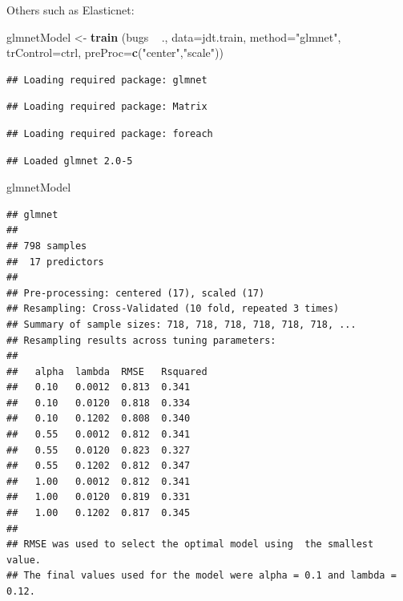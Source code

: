 \documentclass[]{book}
\newenvironment{Shaded}{\begin{snugshade}}{\end{snugshade}}
\newcommand{\KeywordTok}[1]{\textcolor[rgb]{0.13,0.29,0.53}{\textbf{{#1}}}}
\newcommand{\DataTypeTok}[1]{\textcolor[rgb]{0.13,0.29,0.53}{{#1}}}
\newcommand{\StringTok}[1]{\textcolor[rgb]{0.31,0.60,0.02}{{#1}}}
\newcommand{\NormalTok}[1]{{#1}}
\begin{document}
Others such as Elasticnet:

\begin{Shaded}
\begin{Highlighting}[]
\NormalTok{glmnetModel <-}\StringTok{ }\KeywordTok{train} \NormalTok{(bugs ~}\StringTok{ }\NormalTok{., }\DataTypeTok{data=}\NormalTok{jdt.train, }\DataTypeTok{method=}\StringTok{"glmnet"}\NormalTok{, }\DataTypeTok{trControl=}\NormalTok{ctrl, }\DataTypeTok{preProc=}\KeywordTok{c}\NormalTok{(}\StringTok{"center"}\NormalTok{,}\StringTok{"scale"}\NormalTok{))}
\end{Highlighting}
\end{Shaded}

\begin{verbatim}
## Loading required package: glmnet
\end{verbatim}

\begin{verbatim}
## Loading required package: Matrix
\end{verbatim}

\begin{verbatim}
## Loading required package: foreach
\end{verbatim}

\begin{verbatim}
## Loaded glmnet 2.0-5
\end{verbatim}

\begin{Shaded}
\begin{Highlighting}[]
\NormalTok{glmnetModel}
\end{Highlighting}
\end{Shaded}

\begin{verbatim}
## glmnet 
## 
## 798 samples
##  17 predictors
## 
## Pre-processing: centered (17), scaled (17) 
## Resampling: Cross-Validated (10 fold, repeated 3 times) 
## Summary of sample sizes: 718, 718, 718, 718, 718, 718, ... 
## Resampling results across tuning parameters:
## 
##   alpha  lambda  RMSE   Rsquared
##   0.10   0.0012  0.813  0.341   
##   0.10   0.0120  0.818  0.334   
##   0.10   0.1202  0.808  0.340   
##   0.55   0.0012  0.812  0.341   
##   0.55   0.0120  0.823  0.327   
##   0.55   0.1202  0.812  0.347   
##   1.00   0.0012  0.812  0.341   
##   1.00   0.0120  0.819  0.331   
##   1.00   0.1202  0.817  0.345   
## 
## RMSE was used to select the optimal model using  the smallest value.
## The final values used for the model were alpha = 0.1 and lambda = 0.12.
\end{verbatim}
\end{document}
